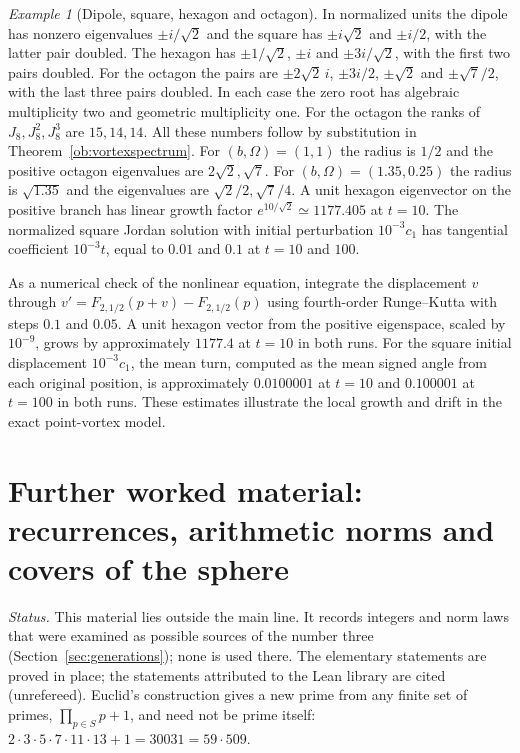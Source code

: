 \documentclass[aps,pra,onecolumn,superscriptaddress,nofootinbib,10pt]{revtex4-2}
\theoremstyle{definition}
\theoremstyle{remark}
\newtheorem{example}[theorem]{Example}
\begin{document}
\begin{example}[Dipole, square, hexagon and octagon]
\label{ob:vortexnumbers}
In normalized units the dipole has nonzero eigenvalues $\pm i/\sqrt{2}$
and the square has $\pm i\sqrt{2}$ and $\pm i/2$, with the latter pair
doubled. The hexagon has $\pm1/\sqrt{2}$, $\pm i$ and $\pm3i/\sqrt{2}$,
with the first two pairs doubled. For the octagon the pairs are
$\pm 2\sqrt{2}\,i$, $\pm 3i/2$, $\pm\sqrt{2}$ and $\pm\sqrt{7}/2$,
with the last three pairs doubled. In each case the zero root has
algebraic multiplicity two and geometric multiplicity one.
For the octagon the ranks of $J_8,J_8^2,J_8^3$ are $15,14,14$.
All these numbers follow by substitution in Theorem~\ref{ob:vortexspectrum}.
For $(b,\Omega)=(1,1)$ the radius is $1/2$ and the positive octagon
eigenvalues are $2\sqrt{2},\sqrt{7}$. For $(b,\Omega)=(1.35,0.25)$ the
radius is $\sqrt{1.35}$ and the eigenvalues are $\sqrt{2}/2,\sqrt{7}/4$.
A unit hexagon eigenvector on the positive branch has linear growth
factor $e^{10/\sqrt{2}}\simeq1177.405$ at $t=10$. The normalized
square Jordan solution with initial perturbation $10^{-3}c_1$
has tangential coefficient $10^{-3}t$, equal to $0.01$ and $0.1$
at $t=10$ and $100$.

As a numerical check of the nonlinear equation, integrate the displacement
$v$ through $v'=F_{2,1/2}(p+v)-F_{2,1/2}(p)$ using fourth-order
Runge--Kutta with steps $0.1$ and $0.05$. A unit hexagon vector from the
positive eigenspace, scaled by $10^{-9}$, grows by approximately $1177.4$
at $t=10$ in both runs. For the square initial displacement $10^{-3}c_1$,
the mean turn, computed as the mean signed angle from each original
position, is approximately $0.0100001$ at $t=10$ and $0.100001$
at $t=100$ in both runs. These estimates illustrate the local growth and
drift in the exact point-vortex model.
\end{example}


\section{Further worked material: recurrences, arithmetic norms and covers of the sphere}\label{app:arith}
\noindent\emph{Status.}  This material lies outside the main line.  It records integers and norm laws that were
examined as possible sources of the number three (Section~\ref{sec:generations}); none is used there.  The
elementary statements are proved in place; the statements attributed to the Lean library \cite{ub:lean} are cited
(unrefereed).  Euclid's construction gives a new prime from any finite set of primes, $\prod_{p\in S}p+1$, and need not be
prime itself: $2\cdot3\cdot5\cdot7\cdot11\cdot13+1=30031=59\cdot509$.
\end{document}
